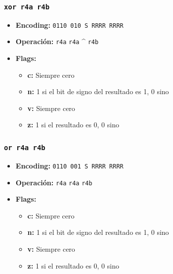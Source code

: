 \documentclass{article}
\begin{document}
\subsubsection{\texttt{xor r4a r4b}}
\begin{itemize}
    \item \textbf{Encoding:} \texttt{0110 010 S RRRR RRRR}
    \item \textbf{Operación:} \texttt{r4a} \Leftarrow \texttt{r4a} \^{} \texttt{r4b}
    \item \textbf{Flags:}
        \begin{itemize}
            \item \textbf{c:} Siempre cero
            \item \textbf{n:} 1 si el bit de signo del resultado es 1, 0 sino
            \item \textbf{v:} Siempre cero
            \item \textbf{z:} 1 si el resultado es 0, 0 sino
        \end{itemize}
\end{itemize}

\subsubsection{\texttt{or r4a r4b}}
\begin{itemize}
    \item \textbf{Encoding:} \texttt{0110 001 S RRRR RRRR}
    \item \textbf{Operación:} \texttt{r4a} \Leftarrow \texttt{r4a} \textbar{} \texttt{r4b}
    \item \textbf{Flags:}
        \begin{itemize}
            \item \textbf{c:} Siempre cero
            \item \textbf{n:} 1 si el bit de signo del resultado es 1, 0 sino
            \item \textbf{v:} Siempre cero
            \item \textbf{z:} 1 si el resultado es 0, 0 sino
        \end{itemize}
\end{itemize}
\end{document}
